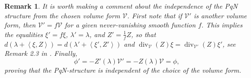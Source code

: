 \documentclass[12pt]{article}
\newtheorem{remark}[theorem]{Remark}
\begin{document}
\begin{remark}\label{rem:indpqn} %
It is worth making a comment about the independence of the PqN structure from the chosen volume form $\mathcal V$. First note that if $\mathcal V'$ is another volume form, then $\mathcal V'=f\mathcal V$ for a given never-vanishing smooth function $f$. This implies the equalities $\xi'=f\xi$, $\lambda'=\lambda$, and $Z'=\frac{1}{f}Z$, so that $d(\lambda+\left<\xi,Z\right>)=d(\lambda'+\left<\xi',Z'\right>)$ and 
${\operatorname{div}}_{\mathcal V}\left(Z\right)\xi={\operatorname{div}}_{\mathcal V'}\left(Z\right)\xi'$, see Remark 2.3 in \cite{Cheng-Sheng}. Finally, 
\[
\phi'=-Z'(\lambda)\mathcal V'=-Z(\lambda)\mathcal V=\phi,
\] 
proving that the PqN-structure is independent of the choice of the volume form.
\end{remark} 
\end{document}
